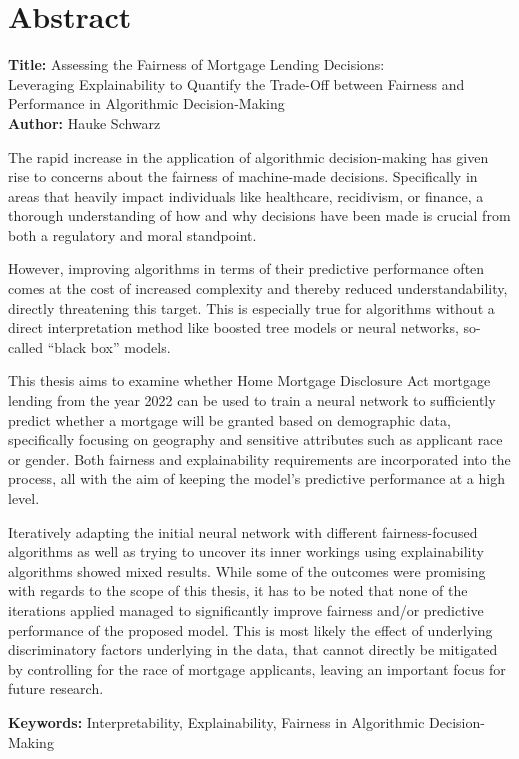 \chapter*{Abstract}\label{abstract}

\noindent
\textbf{Title:} Assessing the Fairness of Mortgage Lending Decisions: \\
Leveraging Explainability to Quantify the Trade-Off between Fairness and Performance in Algorithmic Decision-Making \\ 
\textbf{Author:} Hauke Schwarz
\vspace{1em}

The rapid increase in the application of algorithmic decision-making has given rise to concerns about the fairness of machine-made decisions. Specifically in areas that heavily impact individuals like healthcare, recidivism, or finance, a thorough understanding of how and why decisions have been made is crucial from both a regulatory and moral standpoint.

However, improving algorithms in terms of their predictive performance often comes at the cost of increased complexity and thereby reduced understandability, directly threatening this target. This is especially true for algorithms without a direct interpretation method like boosted tree models or neural networks, so-called “black box” models.

This thesis aims to examine whether Home Mortgage Disclosure Act mortgage lending from the year 2022 can be used to train a neural network to sufficiently predict whether a mortgage will be granted based on demographic data, specifically focusing on geography and sensitive attributes such as applicant race or gender. Both fairness and explainability requirements are incorporated into the process, all with the aim of keeping the model’s predictive performance at a high level.

Iteratively adapting the initial neural network with different fairness-focused algorithms as well as trying to uncover its inner workings using explainability algorithms showed mixed results. While some of the outcomes were promising with regards to the scope of this thesis, it has to be noted that none of the iterations applied managed to significantly improve fairness and/or predictive performance of the proposed model. This is most likely the effect of underlying discriminatory factors underlying in the data, that cannot directly be mitigated by controlling for the race of mortgage applicants, leaving an important focus for future research.

\vspace{3em}

\textbf{Keywords:} Interpretability, Explainability, Fairness in Algorithmic Decision-Making \\